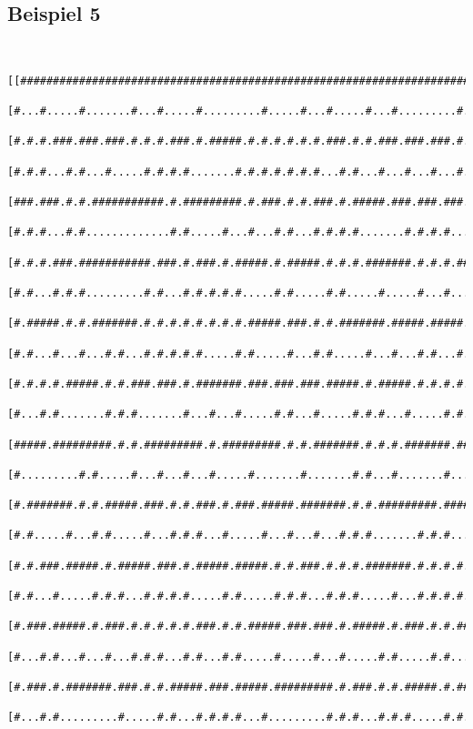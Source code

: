 \documentclass[a4paper,10pt,ngerman]{scrartcl}
\begin{document}
\subsection{Beispiel 5}\mbox{}\\
\begin{lstlisting}[frame=tb,basicstyle=\tiny\ttfamily]
[[#####################################################################################################]
 [#...#.....#.......#...#.....#.........#.....#...#.....#...#.........#...#.......#.....#...#.........#]
 [#.#.#.###.###.###.#.#.#.###.#.#####.#.#.#.#.#.#.###.#.#.###.###.###.#.#.#.###.#.#.#.#.#.#.#####.###.#]
 [#.#.#...#.#...#.....#.#.#.#.......#.#.#.#.#.#.#...#.#...#...#...#...#.#.#...#.#.#.#.#.#.#...#...#.#.#]
 [###.###.#.#.###########.#.#########.#.###.#.#.###.#.#####.###.###.###.###.###.#.#.#.#.#.###.#.###.#.#]
 [#.#.#...#.#.............#.#.....#...#...#.#...#.#.#.#.......#.#.#.#.......#...#.#.#.#...#.....#...#.#]
 [#.#.#.###.###########.###.#.###.#.#####.#.#####.#.#.#.#######.#.#.#.#######.#####.#.###########.###.#]
 [#.#...#.#.#.........#.#...#.#.#.#.#.....#.#.....#.#.....#.....#...#...#...#.......#.......#.......#.#]
 [#.#####.#.#.#######.#.#.#.#.#.#.#.#.#####.###.#.#.#######.#####.#####.###.#####.#########.#######.#.#]
 [#.#...#...#...#.#...#.#.#.#.#.....#.#.....#...#.#.....#...#...#.#...#.....#...#.#.......#.......#.#.#]
 [#.#.#.#.#####.#.#.###.###.#.#######.###.###.###.#####.#.#####.#.#.#.#.#####.#.#.#.#######.#####.#.#.#]
 [#...#.#.......#.#.#.......#...#...#.....#.#...#.....#.#.#...#.....#.#.#...#.#.#...#.....#...#...#.#.#]
 [#####.#########.#.#.#########.#.#########.#.#.#######.#.#.#.#######.###.#.#.#.#.###.###.#####.###.#.#]
 [#.........#.#.....#...#...#...#.....#.......#.......#.#...#.......#.....#.#.#.#.#...#...#.....#...#.#]
 [#.#######.#.#.#####.###.#.#.###.#.###.#####.#######.#.#.#########.#######.#.#.###.#####.#.#####.#.#.#]
 [#.#.....#...#.#.....#...#.#.#...#.....#...#...#...#.#.#.......#.#.#...#.#.#.#...#.....#...#...#.#...#]
 [#.#.###.#####.#.#####.###.#.#####.#####.#.#.###.#.#.#.#######.#.#.#.#.#.#.#.###.#.###.#####.###.#####]
 [#.#...#.....#.#.#...#.#.#.#.....#.#.....#.#.#...#.#.#.....#...#.#.#.#...#.#...#.#.#...#...#...#.#...#]
 [#.###.#####.#.###.#.#.#.#.#.###.#.#.#####.###.###.#.#####.#.###.#.#.#####.###.#.#.#.###.###.#.#.###.#]
 [#...#.#...#...#...#.#.#...#.#...#.#.....#.....#...#.....#.#.....#.#.......#...#.#.#.#...#...#.#.....#]
 [#.###.#.#######.###.#.#.#####.###.#####.#########.#.###.#.#.#####.#.#######.###.###.###.#.###.#####.#]
 [#...#.#.........#.....#.#...#.#.#.#...#.........#.#.#...#.#.#.....#.#.......#...#...#...#.#.#.....#.#]

\end{lstlisting}
\end{document}
